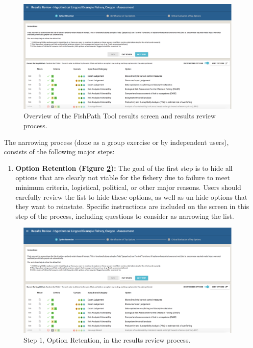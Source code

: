 \documentclass[
  11pt,
]{book}
\providecommand{\tightlist}{%
  \setlength{\itemsep}{0pt}\setlength{\parskip}{0pt}}
\begin{document}
\begin{figure}

{\centering \includegraphics[width=0.95\linewidth]{images/results-review} 

}

\caption{Overview of the FishPath Tool results screen and results review process.}\label{fig:results-review}
\end{figure}

The narrowing process (done as a group exercise or by independent users), consists of the following major steps:

\begin{enumerate}
\def\labelenumi{\arabic{enumi}.}
\tightlist
\item
  \textbf{Option Retention (Figure \ref{fig:review-step-1}):} The goal of the first step is to hide all options that are clearly not viable for the fishery due to failure to meet minimum criteria, logistical, political, or other major reasons. Users should carefully review the list to hide these options, as well as un-hide options that they want to reinstate. Specific instructions are included on the screen in this step of the process, including questions to consider as narrowing the list.
\end{enumerate}

\begin{figure}

{\centering \includegraphics[width=0.95\linewidth]{images/review-step-1} 

}

\caption{Step 1, Option Retention, in the results review process.}\label{fig:review-step-1}
\end{figure}
\end{document}
